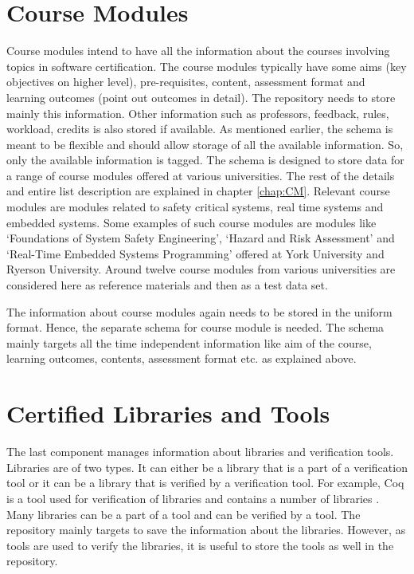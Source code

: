 \documentclass[11pt,letterpaper]{report}
\begin{document}
 \section{Course Modules}
 \label{sec:CM}
 
 Course modules intend to have all the information about the courses involving topics in software certification. The course modules typically have some aims (key objectives on higher level), pre-requisites, content, assessment format and learning outcomes (point out outcomes in detail). The repository needs to store mainly this information. Other information such as professors, feedback, rules, workload, credits is also stored if available. As mentioned earlier, the schema is meant to be flexible and should allow storage of all the available information. So, only the available information is tagged. The schema is designed to store data for a range of course modules offered at various universities. The rest of the details and entire list description are explained in chapter \ref{chap:CM}. Relevant course modules are modules related to safety critical systems, real time systems and embedded systems. Some examples of such course modules are modules like `Foundations of System Safety Engineering', `Hazard and Risk Assessment' and `Real-Time Embedded Systems Programming' offered at York University and Ryerson University. Around twelve course modules from various universities are considered here as reference materials and then as a test data set.
 
 The information about course modules again needs to be stored in the uniform format. Hence, the separate schema for course module is needed. The schema mainly targets all the time independent information like aim of the course, learning outcomes, contents, assessment format etc. as explained above.  
 \section{Certified Libraries and Tools}
 \label{sec:CLT}
 
 The last component manages information about libraries and verification tools. Libraries are of two types. It can either be a library that is a part of a verification tool or it can be a library that is verified by a verification tool. For example, Coq \cite{COQ} is a tool used for verification of libraries and contains a number of libraries \cite{COQ}. Many libraries can be a part of a tool and can be verified by a tool. The repository mainly targets to save the information about the libraries. However, as tools are used to verify the libraries, it is useful to store the tools as well in the repository.
 
\end{document}
